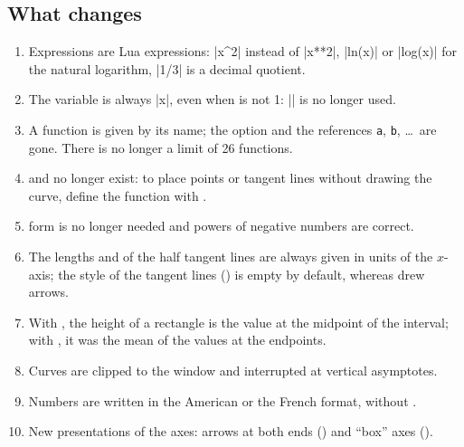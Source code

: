 \subsection{What changes}

\begin{enumerate}
  \item Expressions are Lua expressions: |x^2| instead of |x**2|, |ln(x)| or |log(x)| for the natural logarithm, |1/3| is a decimal quotient.
  \item The variable is always |x|, even when  is not 1: |\x| is no longer used.
  \item A function is given by its name; the option  and the references \texttt{a}, \texttt{b}, \dots\ are gone. There is no longer a limit of 26 functions.
  \item {} and  no longer exist: to place points or tangent lines without drawing the curve, define the function with .
  \item {} form is no longer needed and powers of negative numbers are correct.
  \item The lengths  and  of the half tangent lines are always given in units of the $x$-axis; the style of the tangent lines () is empty by default, whereas  drew arrows.
  \item With , the height of a rectangle is the value at the midpoint of the interval; with , it was the mean of the values at the endpoints.
  \item Curves are clipped to the window and interrupted at vertical asymptotes.
  \item Numbers are written in the American or the French format, without .
  \item New presentations of the axes: arrows at both ends () and ``box'' axes ().
\end{enumerate}

\endinput
